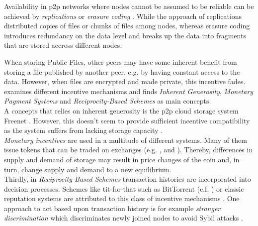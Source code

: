 \documentclass{article}
\begin{document}
Availability in p2p networks where nodes cannot be assumed to be reliable can be achieved by \emph{replications} or \emph{erasure coding} \citep{Weatherspoon.2002}. While the approach of replications distributed copies of files or chunks of files among nodes, whereas erasure coding introduces redundancy on the data level and breaks up the data into fragments that are stored accross different nodes. 
\\\vspace{0.5em}

When storing Public Files, other peers may have some inherent benefit from storing a file published by another peer, e.g. by having constant access to the data. However, when files are encrypted and made private, this incentive fades. 
\\
\cite{Feldman.2005} examines different incentive mechanisms and finds \emph{Inherent Generosity}, \emph{Monetary Payment Systems} and \emph{Reciprocity-Based Schemes} as main concepts.
\\
A concepts that relies on inherent generosity is the p2p cloud storage system Freenet \citep{Clarke.2001}. However, this doesn't seem to provide sufficient incentive compatibility as the system suffers from lacking storage capacity \citep{Kopp.2017}.
\\
\emph{Monetary incentives} are used in a multitude of different systems. Many of them issue tokens that can be traded on exchanges (e.g. \cite{Vorick.2014}, \cite{Wilkinson.2014} and \cite{Lambert.2015}). Thereby, differences in supply and demand of storage may result in price changes of the coin and, in turn, change supply and demand to a new equilibrium. 
\\
Thirdly, in \emph{Reciprocity-Based Schemes} transaction histories are incorporated into decision processes. Schemes like tit-for-that such as BitTorrent (c.f. \cite{Cohen.2003}) or classic reputation systems are attributed to this class of incentive mechanisms \citep{Feldman.2005}. One approach to act based upon transaction history is for example \emph{stranger discrimination} which discriminates newly joined nodes to avoid Sybil attacks \citep{Lai.2003}.
\\\vspace{0.5em}
\end{document}
